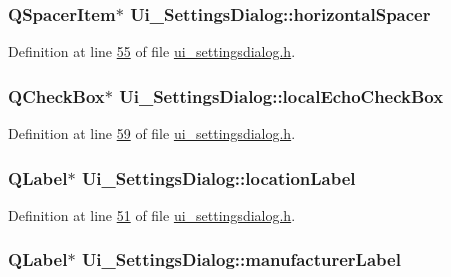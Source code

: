 \hypertarget{a00029_a91941a5010b87cc8a0c26a641d4a7808}{
\subsubsection[{horizontal\+Spacer}]{\setlength{\rightskip}{0pt plus 5cm}Q\+Spacer\+Item$\ast$ Ui\+\_\+\+Settings\+Dialog\+::horizontal\+Spacer}}\label{a00029_a91941a5010b87cc8a0c26a641d4a7808}


Definition at line \hyperlink{a00054_source_l00055}{55} of file \hyperlink{a00054_source}{ui\+\_\+settingsdialog.\+h}.

\hypertarget{a00029_a4cef19b8232e266ba202152ade600263}{
\subsubsection[{local\+Echo\+Check\+Box}]{\setlength{\rightskip}{0pt plus 5cm}Q\+Check\+Box$\ast$ Ui\+\_\+\+Settings\+Dialog\+::local\+Echo\+Check\+Box}}\label{a00029_a4cef19b8232e266ba202152ade600263}


Definition at line \hyperlink{a00054_source_l00059}{59} of file \hyperlink{a00054_source}{ui\+\_\+settingsdialog.\+h}.

\hypertarget{a00029_ad860892f11a79cb726643d3478078fcd}{
\subsubsection[{location\+Label}]{\setlength{\rightskip}{0pt plus 5cm}Q\+Label$\ast$ Ui\+\_\+\+Settings\+Dialog\+::location\+Label}}\label{a00029_ad860892f11a79cb726643d3478078fcd}


Definition at line \hyperlink{a00054_source_l00051}{51} of file \hyperlink{a00054_source}{ui\+\_\+settingsdialog.\+h}.

\hypertarget{a00029_afeadc7657c9eaa3103bd529342f5fe97}{
\subsubsection[{manufacturer\+Label}]{\setlength{\rightskip}{0pt plus 5cm}Q\+Label$\ast$ Ui\+\_\+\+Settings\+Dialog\+::manufacturer\+Label}}\label{a00029_afeadc7657c9eaa3103bd529342f5fe97}


